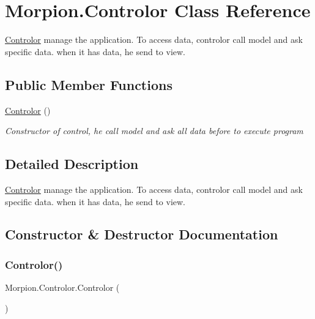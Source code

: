 \hypertarget{class_morpion_1_1_controlor}{}\section{Morpion.\+Controlor Class Reference}
\label{class_morpion_1_1_controlor}


\hyperlink{class_morpion_1_1_controlor}{Controlor} manage the application. To access data, controlor call model and ask specific data. when it has data, he send to view.  


\subsection*{Public Member Functions}
\begin{DoxyCompactItemize}
\item 
\hyperlink{class_morpion_1_1_controlor_ac43833b173f2a2e53cab4dd277d6fc0f}{Controlor} ()
\begin{DoxyCompactList}\small\item\em Constructor of control, he call model and ask all data before to execute program \end{DoxyCompactList}\end{DoxyCompactItemize}


\subsection{Detailed Description}
\hyperlink{class_morpion_1_1_controlor}{Controlor} manage the application. To access data, controlor call model and ask specific data. when it has data, he send to view. 



\subsection{Constructor \& Destructor Documentation}
\mbox{\label{class_morpion_1_1_controlor_ac43833b173f2a2e53cab4dd277d6fc0f}} 
\subsubsection{\texorpdfstring{Controlor()}{Controlor()}}
{\footnotesize\ttfamily Morpion.\+Controlor.\+Controlor (\begin{DoxyParamCaption}{ }\end{DoxyParamCaption})}



